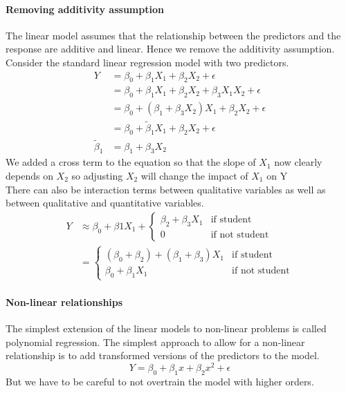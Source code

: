 \documentclass[../document.tex]{subfiles}
\begin{document}
	\paragraph{Removing additivity assumption}
	The linear model assumes that the relationship between the predictors and the response are additive and linear. Hence we remove the additivity assumption. \\
	Consider the standard linear regression model with two predictors.
	\begin{equation}
	\begin{split}
		Y &= \beta_{0}+\beta_{1}X_{1}+\beta_{2}X_{2}+\epsilon\\
		&=\beta_{0}+\beta_{1}X_{1}+\beta_{2}X_{2}+\beta_{3}X_{1}X_{2}+\epsilon\\
		&=\beta_{0}+(\beta_{1}+\beta_{3}X_{2})X_{1}+\beta_{2}X_{2}+\epsilon\\
		&=\beta_{0}+\tilde{\beta}_{1}X_{1}+\beta_{2}X_{2}+\epsilon\\
		\tilde{\beta}_{1}&=\beta_{1}+\beta_{3}X_{2}
	\end{split}
	\end{equation}
	We added a cross term to the equation so that the slope of \(X_{1}\) now clearly depends on \(X_{2}\) so adjusting \(X_{2}\) will change the impact of \(X_{1}\) on Y\\
	There can also be interaction terms between qualitative variables as well as between qualitative and quantitative variables.
	\begin{equation}
	\begin{split}
		Y &\approx \beta_{0}+\beta{1}X_{1}+\begin{cases}
			\beta_{2}+\beta_{3}X_{1} &\text{if student}\\
			0 &\text{if not student}
		\end{cases}\\
		&=\begin{cases}
			(\beta_{0}+\beta_{2})+(\beta_{1}+\beta_{3})X_{1} &\text{if student}\\
			\beta_{0}+\beta_{1}X_{1} &\text{if not student}
		\end{cases}
	\end{split}
	\end{equation}

	\paragraph{Non-linear relationships}
	The simplest extension of the linear models to non-linear problems is called polynomial regression. The simplest approach to allow for a non-linear relationship is to add transformed versions of the predictors to the model.
	\begin{equation}
		Y = \beta_{0}+\beta_{1}x+\beta_{2}x^2+\epsilon
	\end{equation}
	But we have to be careful to not overtrain the model with higher orders.
\end{document}
